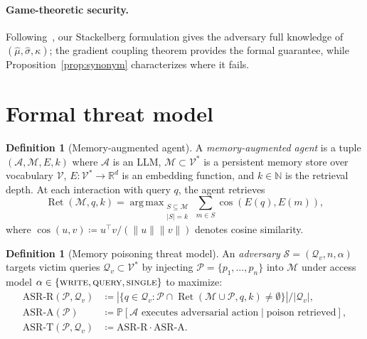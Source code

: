 \documentclass{article}
\theoremstyle{definition}
\newtheorem{definition}[theorem]{Definition}
\newcommand{\asrr}{\text{ASR-R}}
\newcommand{\asra}{\text{ASR-A}}
\newcommand{\asrt}{\text{ASR-T}}
\newcommand{\RR}{\mathbb{R}}
\newcommand{\PP}{\mathbb{P}}
\newcommand{\NN}{\mathbb{N}}
\newcommand{\cM}{\mathcal{M}}
\newcommand{\cP}{\mathcal{P}}
\newcommand{\cQ}{\mathcal{Q}}
\newcommand{\cV}{\mathcal{V}}
\newcommand{\cA}{\mathcal{A}}
\newcommand{\cS}{\mathcal{S}}
\newcommand{\enc}{E}
\DeclareMathOperator*{\argmax}{arg\,max}
\DeclareMathOperator{\Ret}{Ret}
\DeclareMathOperator{\cosim}{cos}
\begin{document}
\paragraph{Game-theoretic security.}
Following~\citet{tramer2020adaptive,carlini2017evaluating}, our Stackelberg formulation gives the adversary full knowledge of $(\hat{\mu}, \hat{\sigma}, \kappa)$; the gradient coupling theorem provides the formal guarantee, while Proposition~\ref{prop:synonym} characterizes where it fails.

\section{Formal threat model}
\label{sec:threat}

\begin{definition}[Memory-augmented agent]
\label{def:agent}
A \emph{memory-augmented agent} is a tuple $(\cA, \cM, \enc, k)$ where $\cA$ is an LLM, $\cM \subset \cV^*$ is a persistent memory store over vocabulary $\cV$, $\enc : \cV^* \to \RR^d$ is an embedding function, and $k \in \NN$ is the retrieval depth. At each interaction with query $q$, the agent retrieves
\begin{equation}
  \Ret(\cM, q, k) = \argmax_{\substack{S \subseteq \cM \\ |S| = k}} \sum_{m \in S} \cosim(\enc(q), \enc(m)),
  \label{eq:retrieval}
\end{equation}
where $\cosim(u, v) \coloneqq u^\top v / (\|u\| \|v\|)$ denotes cosine similarity.
\end{definition}

\begin{definition}[Memory poisoning threat model]
\label{def:threat_model}
An \emph{adversary} $\cS = (\cQ_v, n, \alpha)$ targets victim queries $\cQ_v \subset \cV^*$ by injecting $\cP = \{p_1, \ldots, p_n\}$ into $\cM$ under access model $\alpha \in \{\textsc{write}, \textsc{query}, \textsc{single}\}$ to maximize:
\begin{align}
  \asrr(\cP, \cQ_v) &\coloneqq |\{q \in \cQ_v : \cP \cap \Ret(\cM \cup \cP, q, k) \neq \emptyset\}| / |\cQ_v|, \label{eq:asrr} \\
  \asra(\cP) &\coloneqq \PP[\cA \text{ executes adversarial action} \mid \text{poison retrieved}], \label{eq:asra} \\
  \asrt(\cP, \cQ_v) &\coloneqq \asrr \cdot \asra. \label{eq:asrt}
\end{align}
\end{definition}
\end{document}
